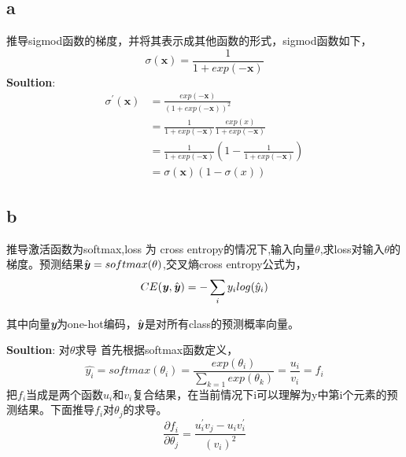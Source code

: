 \documentclass[twoside,nofonts,fancyhdr,openany,UTF8,fleqn]{ctexart} %
\begin{document}
\subsection{a}
推导sigmod函数的梯度，并将其表示成其他函数的形式，sigmod函数如下，
\begin{equation}
 \sigma(\textbf{x}) = \frac{1}{1+exp(-\textbf{x})} 
\end{equation}
\textbf{Soultion}:
\begin{align}
\sigma^\prime(\textbf{x})  & = \frac{exp(-\textbf{x})}{(1+exp(-\textbf{x}))^2} \\
		& = \frac{1}{1+exp(-\textbf{x})}\frac{exp(x)}{1+exp(-\textbf{x})} \\
	& = \frac{1}{1+exp(-\textbf{x})}(1- \frac{1}{1+exp(-\textbf{x})})	\\
	& = \sigma(\textbf{x})(1-\sigma(x))
\end{align}

\subsection{b} 
推导激活函数为softmax,loss 为 cross entropy的情况下,输入向量$\theta$,求loss对输入$\theta$的梯度。预测结果$\hat{\textbf{\emph{y}}}=softmax(\theta)$,交叉熵cross entropy公式为，
\begin{equation}
CE(\textbf{\emph{y}}, \hat{\textbf{\emph{y}}}) = - \sum_{i}y_ilog(\hat{y}_i)
\end{equation}

其中向量\textbf{\emph{y}}为one-hot编码，$\hat{\textbf{\emph{y}}}$是对所有class的预测概率向量。

\textbf{Soultion}:
对$\theta$求导
首先根据softmax函数定义，
\begin{equation}
\widehat{y_i} = softmax(\theta_{i}) = \frac{exp(\theta_{i})}{\sum_{k=1}{exp(\theta_{k})}} = \frac{u_i}{v_i}=f_i
\end{equation}
把$f_i$当成是两个函数$u_i$和$v_i$复合结果，在当前情况下i可以理解为y中第i个元素的预测结果。下面推导$f_i$对$\theta_j$的求导。
\begin{equation}
\frac{\partial{f_i}}{\partial{\theta_j}} = \frac{u_{i}^{\prime}v_j-u_{i}v_{i}^{\prime}}{(v_i)^2}
\end{equation}
\end{document}
